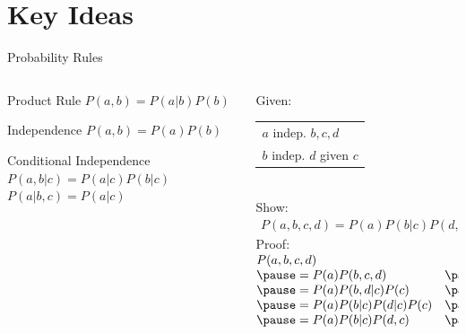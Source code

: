 \documentclass[12pt]{beamer}
\begin{document}
\part{Key Ideas}
\begin{frame}{Probability Rules}
	\begin{columns}
		\begin{column}{2in}
			\begin{block}{Product Rule}
				$P(a,b) = P(a|b)P(b)$
			\end{block}
			\begin{block}{Independence}
				$P(a,b) = P(a)P(b)$
			\end{block}
			\begin{block}{Conditional Independence}
				$P(a,b|c) = P(a|c)P(b|c)$ \\
				$P(a|b,c) = P(a|c)$ \\
			\end{block}
		\end{column}
		\pause
		\begin{column}{2.4in}
			\small
			Given: 
			\begin{tabular}[t]{l}
				$a$ indep. $b,c,d$ \\
				$b$ indep. $d$ given $c$
			\end{tabular}
			\\ \smallskip
			Show:
			\\ \smallskip
			$
			\begin{array}{l}
				P(a,b,c,d) = P(a)P(b|c)P(d,c)
			\end{array}
			$
			\\ \bigskip
			\pause
			Proof:
			\\ \smallskip
			$
			\begin{array}{@{}ll@{}}
			\lefteqn{P(a,b,c,d)} \\
			\pause = P(a)P(b,c,d)         & \pause\mbox{Indep.} \\
			\pause = P(a)P(b,d|c)P(c)     & \pause\mbox{Product} \\
			\pause = P(a)P(b|c)P(d|c)P(c) & \pause\mbox{Cond.} \\
			\pause = P(a)P(b|c)P(d,c)     & \pause\mbox{Product} \\
			\end{array}
			$
		\end{column}
	\end{columns}
\end{frame}
\end{document}
